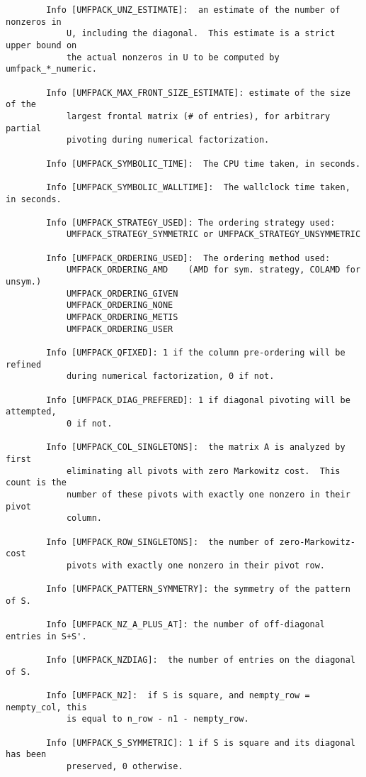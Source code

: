\documentclass[11pt]{article}
\begin{document}
{\begin{verbatim}
        Info [UMFPACK_UNZ_ESTIMATE]:  an estimate of the number of nonzeros in
            U, including the diagonal.  This estimate is a strict upper bound on
            the actual nonzeros in U to be computed by umfpack_*_numeric.

        Info [UMFPACK_MAX_FRONT_SIZE_ESTIMATE]: estimate of the size of the
            largest frontal matrix (# of entries), for arbitrary partial
            pivoting during numerical factorization.

        Info [UMFPACK_SYMBOLIC_TIME]:  The CPU time taken, in seconds.

        Info [UMFPACK_SYMBOLIC_WALLTIME]:  The wallclock time taken, in seconds.

        Info [UMFPACK_STRATEGY_USED]: The ordering strategy used:
            UMFPACK_STRATEGY_SYMMETRIC or UMFPACK_STRATEGY_UNSYMMETRIC

        Info [UMFPACK_ORDERING_USED]:  The ordering method used:
            UMFPACK_ORDERING_AMD    (AMD for sym. strategy, COLAMD for unsym.)
            UMFPACK_ORDERING_GIVEN
            UMFPACK_ORDERING_NONE
            UMFPACK_ORDERING_METIS
            UMFPACK_ORDERING_USER

        Info [UMFPACK_QFIXED]: 1 if the column pre-ordering will be refined
            during numerical factorization, 0 if not.

        Info [UMFPACK_DIAG_PREFERED]: 1 if diagonal pivoting will be attempted,
            0 if not.

        Info [UMFPACK_COL_SINGLETONS]:  the matrix A is analyzed by first
            eliminating all pivots with zero Markowitz cost.  This count is the
            number of these pivots with exactly one nonzero in their pivot
            column.

        Info [UMFPACK_ROW_SINGLETONS]:  the number of zero-Markowitz-cost
            pivots with exactly one nonzero in their pivot row.

        Info [UMFPACK_PATTERN_SYMMETRY]: the symmetry of the pattern of S.

        Info [UMFPACK_NZ_A_PLUS_AT]: the number of off-diagonal entries in S+S'.

        Info [UMFPACK_NZDIAG]:  the number of entries on the diagonal of S.

        Info [UMFPACK_N2]:  if S is square, and nempty_row = nempty_col, this
            is equal to n_row - n1 - nempty_row.

        Info [UMFPACK_S_SYMMETRIC]: 1 if S is square and its diagonal has been
            preserved, 0 otherwise.



\end{verbatim}}
\end{document}
